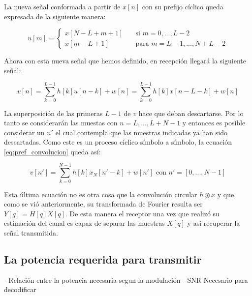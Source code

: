 La nueva señal conformada a partir de $x[n]$ con su prefijo cíclico queda expresada de la siguiente manera:

\begin{equation}
 u[m] =
  \begin{cases}
    x[N-L+m+1]       & \quad \text{si } m = 0,..., L-2\\
    x[m-L+1]  & \quad \text{para } m = L-1,..., N+L-2
  \end{cases}
\end{equation}

Ahora con esta nueva señal que hemos definido, en recepción llegará la siguiente señal:

\begin{equation}\label{eq:pref_convolucion}
v[n] = \sum_{k = 0}^{L-1}h[k]u[n-k] + w[n] = \sum_{k = 0}^{L-1}h[k]x[n-L-k] + w[n]
\end{equation}

La superposición de las primeras $L-1$ de $v$ hace que deban descartarse. Por lo tanto se considerarán las muestas con $n = L,..., L+N-1$ y entonces es posible considerar un $n'$ el cual contempla que las muestras indicadas ya han sido descartadas. Como este es un proceso cíclico símbolo a símbolo, la ecuación \ref{eq:pref_convolucion} queda así: 

\begin{equation}
v[n'] = \sum_{k = 0}^{N-1}h[k]x_N[n'- k] + w[n'] \text{ con } n' = [0, ..., N-1]
\end{equation}

Esta última ecuación no es otra cosa que la convolución circular $h \circledast x$ y que, como se vió anteriormente, su transformada de Fourier resulta ser $Y[q] = H[q]X[q]$.
De esta manera el receptor una vez que realizó su estimación del canal es capaz de separar las muestras $X[q]$ y así recuperar la señal transmitida.

\subsection{La potencia requerida para transmitir}
- Relación entre la potencia necesaria segun la modulación
- SNR Necesario para decodificar
